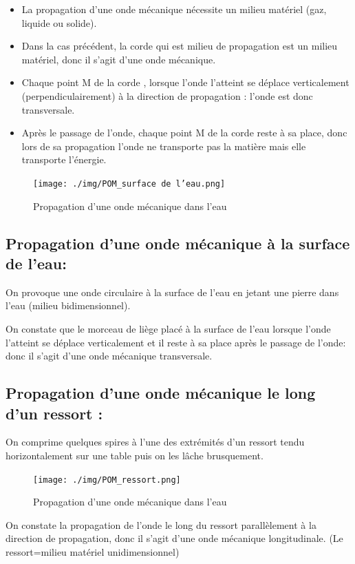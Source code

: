 \documentclass[12pt]{article}
\begin{document}
\begin{itemize}
	\item La propagation d'une onde mécanique nécessite un milieu matériel (gaz, liquide ou solide).
	\item Dans la cas précédent, la corde qui est milieu de propagation est un milieu matériel, donc il s'agit d'une onde mécanique.
	\item Chaque point M de la corde , lorsque l'onde l'atteint se déplace verticalement (perpendiculairement) à la direction de
propagation : l'onde est donc transversale.
\item Après le passage de l'onde, chaque point M de la corde reste à sa place, donc lors de sa propagation l'onde ne transporte pas la
matière mais elle transporte l'énergie.

\end{itemize}

\begin{figure}	
	\vspace{-2cm}
	\texttt{[image: ./img/POM\_surface de l'eau.png]}
	\caption{Propagation d'une onde mécanique dans l'eau}
\end{figure}
\subsection{Propagation d'une onde mécanique à la surface de l'eau:}
On provoque une onde circulaire à la surface de l'eau en jetant une pierre dans l'eau (milieu bidimensionnel).

On constate que le morceau de liège placé à la surface de l'eau lorsque l'onde l'atteint se déplace verticalement et il reste à sa
place après le passage de l'onde: donc il s'agit d'une onde mécanique transversale.

\subsection{Propagation d'une onde mécanique le long d'un ressort :}

On comprime quelques spires à l'une des extrémités d'un ressort tendu horizontalement sur une table puis on les lâche brusquement.

\begin{figure}	
	\caption{Propagation d'une onde mécanique dans l'eau}
	\texttt{[image: ./img/POM\_ressort.png]}
\end{figure}
On constate la propagation de l'onde le long du ressort parallèlement à la direction de propagation, donc il s'agit d'une onde
mécanique longitudinale. (Le ressort=milieu matériel unidimensionnel)
\end{document}
